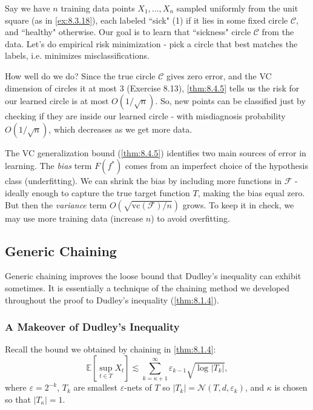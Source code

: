\begin{example}[Classification]
Say we have $n$ training data points $X_1, \dots, X_n$ sampled uniformly from the unit square (as in 
\cref{ex:8.3.18}), each labeled ``sick" (1) if it lies in some fixed circle $\mathcal{C}$, and ``healthy" 
otherwise. Our goal is to learn that ``sickness" circle $\mathcal{C}$ from the data. Let's do empirical risk 
minimization - pick a circle that best matches the labels, i.e. minimizes misclassifications.

How well do we do? Since the true circle $\mathcal{C}$ gives zero error, and the VC dimension of circles it 
at most 3 (Exercise 8.13), \cref{thm:8.4.5} tells us the risk for our learned circle is at most 
$O(1/\sqrt{n})$. So, new points can be classified just by checking if they are inside our learned circle - 
with misdiagnosis probability $O(1/\sqrt{n})$, which decreases as we get more data.
\end{example}

\begin{remark}
\label{rmk:8.4.7}
The VC generalization bound (\cref{thm:8.4.5}) identifies two main sources of error in learning. The 
\textit{bias} term $F(f^*)$ comes from an imperfect choice of the hypothesis class (underfitting). We can 
shrink the bias by including more functions in $\mathcal{F}$ - ideally enough to capture the true target 
function $T$, making the bias equal zero. But then the \textit{variance} term 
$O(\sqrt{\mathrm{vc}(\mathcal{F})/n})$ grows. To keep it in check, we may use more training data (increase $n$) 
to avoid overfitting.
\end{remark}



\subsection{Generic Chaining}
Generic chaining improves the loose bound that Dudley's inequality can exhibit sometimes. It is essentially a 
technique of the chaining method we developed throughout the proof to Dudley's inequality (\cref{thm:8.1.4}).


\subsubsection{A Makeover of Dudley's Inequality}
Recall the bound we obtained by chaining in \cref{thm:8.1.4}:
\[ \mathbb{E}\left[ \sup_{t \in T}X_t \right] \lesssim \sum_{k = \kappa + 1}^{\infty} \varepsilon_{k - 1} 
\sqrt{\log_{}{|T_k|}}, \]
where $\varepsilon = 2^{-k}$, $T_k$ are smallest $\varepsilon$-nets of $T$ so $|T_k| = \mathcal{N}(T, d, 
\varepsilon_k)$, and $\kappa$ is chosen so that $|T_{\kappa}| = 1$.

